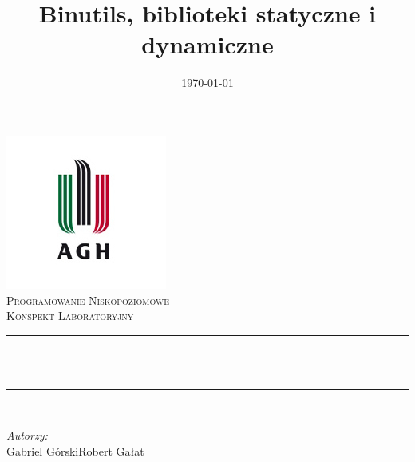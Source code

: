 \documentclass[12pt]{article}
\title{Binutils, biblioteki statyczne i dynamiczne} %
\author{} %
\date{\today} %
\begin{document}

\begin{titlepage}
  \centering \vspace*{0.5 cm} \includegraphics[scale = 0.75]{agh.jpg}\\[1.0
  cm] %
  \textsc{\Large Programowanie Niskopoziomowe}\\[0.5 cm] %
  \textsc{\large Konspekt Laboratoryjny}\\[0.5 cm] %
  \rule{\linewidth}{0.2 mm} \\[0.4 cm]
  { \huge \bfseries \thetitle}\\
  \rule{\linewidth}{0.2 mm} \\[1.5 cm]

  \begin{minipage}{0.4\textwidth}
    \begin{flushleft} \large \vspace{3cm}
      \emph{Autorzy:}\\
      Gabriel Górski\newline Robert Gałat %
    \end{flushleft}
  \end{minipage}~
  \begin{minipage}{0.4\textwidth}
    \begin{flushright} \large
    \end{flushright}
  \end{minipage}\\[2 cm]

  {\large \thedate}\\[2 cm]

  \vfill

\end{titlepage}
\end{document}
